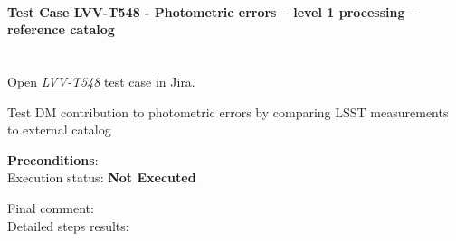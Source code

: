 \documentclass[DM,lsstdraft,STR,toc]{lsstdoc}
\begin{document}
\paragraph{Test Case LVV-T548 - Photometric errors -- level 1 processing -- reference catalog
 }\mbox{}\\

Open  \href{https://jira.lsstcorp.org/secure/Tests.jspa#/testCase/LVV-T548}{\textit{ LVV-T548 } }
test case in Jira.

Test DM contribution to photometric errors by comparing LSST
measurements to external catalog


\textbf{ Preconditions}:\\


Execution status: {\bf Not Executed }

Final comment:\\


Detailed steps results:
\end{document}
